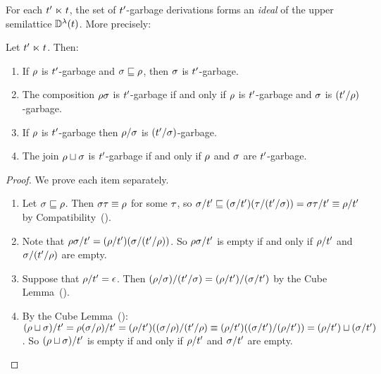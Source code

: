 For each $t' \mathrel{\ltimes} t$, the set of $t'$-garbage derivations forms an {\em ideal} of the upper semilattice $\mathbb{D}^{\lambda}(t)$.
More precisely:
\begin{proposition}
Let $t' \mathrel{\ltimes} t$. Then:
\begin{enumerate}
\item If $\rho$ is $t'$-garbage and $\sigma \sqsubseteq \rho$, then $\sigma$ is $t'$-garbage.
  \label{properties_of_garbage__downwards_closed}
\item The composition $\rho\sigma$ is $t'$-garbage if and only if $\rho$ is $t'$-garbage and $\sigma$ is $(t'/\rho)$-garbage.
\item If $\rho$ is $t'$-garbage then $\rho/\sigma$ is $(t'/\sigma)$-garbage.
\item The join $\rho \sqcup \sigma$ is $t'$-garbage if and only if $\rho$ and $\sigma$ are $t'$-garbage.
\end{enumerate}
\end{proposition}
\begin{proof} We prove each item separately.
\begin{enumerate}
\item Let $\sigma \sqsubseteq \rho$.
      Then $\sigma\tau \equiv \rho$ for some $\tau$,
      so $\sigma/t' \sqsubseteq (\sigma/t')(\tau/(t'/\sigma)) = \sigma\tau/t' \equiv \rho/t'$
      by Compatibility~().
\item Note that $\rho\sigma/t' = (\rho/t')(\sigma/(t'/\rho))$.
      So $\rho\sigma/t'$ is empty if and only if
      $\rho/t'$ and $\sigma/(t'/\rho)$ are empty.
\item Suppose that $\rho/t' = \epsilon$.
      Then $(\rho/\sigma)/(t'/\sigma) = (\rho/t')/(\sigma/t')$
      by the Cube Lemma~().
\item By the Cube Lemma~():
      $(\rho \sqcup \sigma)/t' = \rho(\sigma/\rho)/t' =
      (\rho/t')((\sigma/\rho)/(t'/\rho) \equiv
      (\rho/t')((\sigma/t')/(\rho/t')) =
      (\rho/t') \sqcup (\sigma/t')$.
      So $(\rho \sqcup \sigma)/t'$ is empty if and only if
      $\rho/t'$ and $\sigma/t'$ are empty.
\end{enumerate}
\end{proof}

